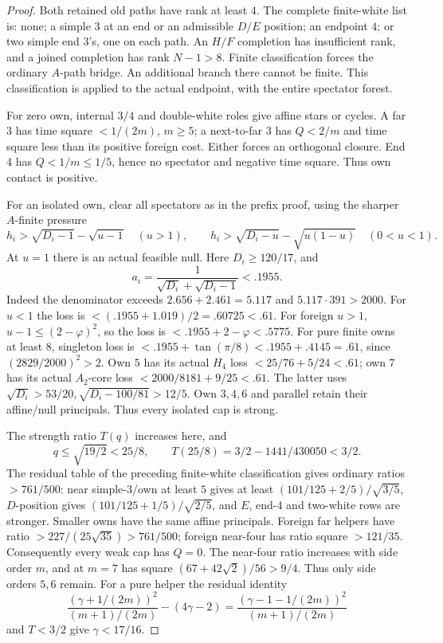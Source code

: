 \documentclass[11pt]{article}
\theoremstyle{definition}
\theoremstyle{remark}
\begin{document}
\begin{proof}
Both retained old paths have rank at least \(4\).
The complete finite-white list is: none; a simple \(3\)
at an end or an admissible \(D/E\) position; an endpoint
\(4\); or two simple end \(3\)'s, one on each path.
An \(H/F\) completion has insufficient rank, and a joined
completion has rank \(N-1>8\). Finite classification forces
the ordinary \(A\)-path bridge. An additional branch there
cannot be finite. This classification is applied to the
actual endpoint, with the entire spectator forest.

For zero own, internal \(3/4\) and double-white roles
give affine stars or cycles. A far \(3\) has time square
\(<1/(2m)\), \(m\geq5\); a next-to-far \(3\) has
\(Q<2/m\) and time square less than its positive foreign
cost. Either forces an orthogonal closure. End \(4\)
has \(Q<1/m\leq1/5\), hence no spectator and negative
time square. Thus own contact is positive.

For an isolated own, clear all spectators as in the
prefix proof, using the sharper \(A\)-finite pressure
\[
 h_i>\sqrt{D_i-1}-\sqrt{u-1}\quad(u>1),\qquad
 h_i>\sqrt{D_i-u}-\sqrt{u(1-u)}\quad(0<u<1).
\]
At \(u=1\) there is an actual feasible null.
Here \(D_i\geq120/17\), and
\[
 a_i=\frac1{\sqrt{D_i}+\sqrt{D_i-1}}<.1955.
\]
Indeed the denominator exceeds \(2.656+2.461=5.117\)
and \(5.117\cdot391>2000\).
For \(u<1\) the loss is
\(<(.1955+1.019)/2=.60725<.61\).
For foreign \(u>1\), \(u-1\leq(2-\varphi)^2\),
so the loss is \(<.1955+2-\varphi<.5775\).
For pure finite owns at least \(8\), singleton loss is
\(<.1955+\tan(\pi/8)<.1955+.4145=.61\),
since \((2829/2000)^2>2\).
Own \(5\) has its actual \(H_4\) loss
\(<25/76+5/24<.61\); own \(7\) has its actual
\(A_2\)-core loss \(<2000/8181+9/25<.61\).
The latter uses
\(\sqrt{D_i}>53/20,\sqrt{D_i-100/81}>12/5\).
Own \(3,4,6\) and parallel retain their affine/null
principals. Thus every isolated cap is strong.

The strength ratio \(T(q)\) increases here, and
\[
 q\leq\sqrt{19/2}<25/8,\qquad
 T(25/8)=3/2-1441/430050<3/2.
\]
The residual table of the preceding finite-white
classification gives ordinary ratios \(>761/500\):
near simple-\(3\)/own at least \(5\) gives at least
\((101/125+2/5)/\sqrt{3/5}\), \(D\)-position gives
\((101/125+1/5)/\sqrt{2/5}\), and \(E\), end-\(4\)
and two-white rows are stronger. Smaller owns have
the same affine principals. Foreign far helpers have
ratio \(>227/(25\sqrt{35})>761/500\);
foreign near-four has ratio square \(>121/35\).
Consequently every weak cap has \(Q=0\).
The near-four ratio increases with side order \(m\),
and at \(m=7\) has square
\((67+42\sqrt2)/56>9/4\).
Thus only side orders \(5,6\) remain.
For a pure helper the residual identity
\[
 \frac{(\gamma+1/(2m))^2}{(m+1)/(2m)}-(4\gamma-2)
 =\frac{(\gamma-1-1/(2m))^2}{(m+1)/(2m)}
\]
and \(T<3/2\) give \(\gamma<17/16\).


\end{proof}
\end{document}
